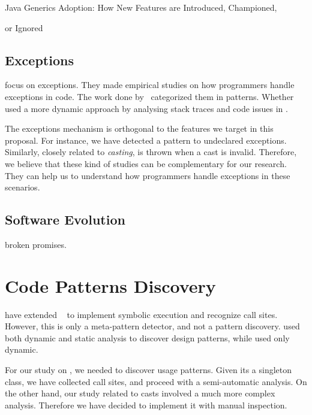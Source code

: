Java Generics Adoption: How New Features are Introduced, Championed,

or Ignored~\cite{parnin_java_2011,parnin_adoption_2013}


\subsection*{Exceptions}

\cite{kery_examining_2016,asaduzzaman_how_2016} focus on exceptions.
They made empirical studies on how programmers handle exceptions in \java{} code.
The work done by~\cite{nakshatri_analysis_2016} categorized them in patterns.
Whether~\cite{coelho_unveiling_2015} used a more dynamic approach by analysing stack traces and code issues in \github{}.

The exceptions mechanism is orthogonal to the features we target in this proposal.
For instance, we have detected a \smu{} pattern to \throw{} undeclared exceptions.
Similarly, closely related to \emph{casting}, \cce{} is thrown when a cast is invalid.
Therefore, we believe that these kind of studies can be complementary for our research. They can help us to understand how programmers handle exceptions in these scenarios.

\subsection{Software Evolution}

\cite{dietrich_broken_2014} broken promises.


\section{Code Patterns Discovery} \label{sec:pattern-discovery}

\cite{posnett_thex:_2010} have extended \asm{}~\cite{bruneton_asm:_2002,kuleshov_using_2007} to implement symbolic execution and recognize call sites.
However, this is only a meta-pattern detector, and not a pattern discovery.
\cite{hu_dynamic_2008} used both dynamic and static analysis to discover design patterns, while \cite{arcelli_design_2008} used only dynamic.

For our study on \smu{}, we needed to discover usage patterns.
Given its a singleton class, we have collected call sites,
and proceed with a semi-automatic analysis.
On the other hand, our study related to casts involved a much more complex analysis.
Therefore we have decided to implement it with manual inspection.

